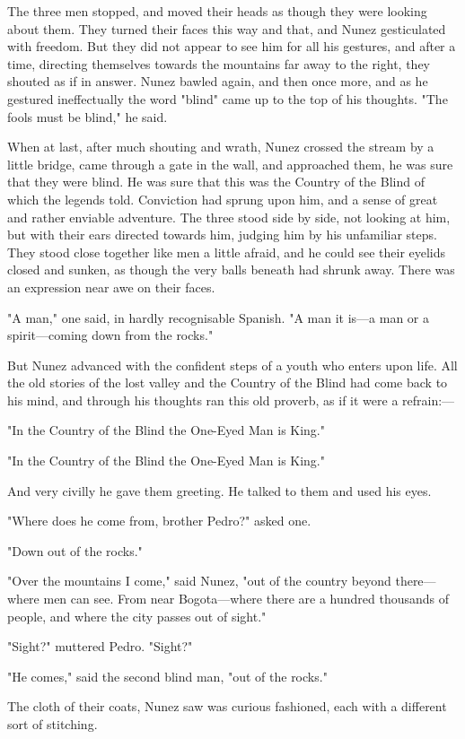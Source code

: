 \documentclass[courier]{sffms}
\begin{document}
The three men stopped, and moved their heads as though they were
looking about them. They turned their faces this way and that, and
Nunez gesticulated with freedom. But they did not appear to see him
for all his gestures, and after a time, directing themselves towards
the mountains far away to the right, they shouted as if in
answer. Nunez bawled again, and then once more, and as he gestured
ineffectually the word "blind" came up to the top of his
thoughts. "The fools must be blind," he said.

When at last, after much shouting and wrath, Nunez crossed the stream
by a little bridge, came through a gate in the wall, and approached
them, he was sure that they were blind. He was sure that this was the
Country of the Blind of which the legends told. Conviction had sprung
upon him, and a sense of great and rather enviable adventure. The
three stood side by side, not looking at him, but with their ears
directed towards him, judging him by his unfamiliar steps. They stood
close together like men a little afraid, and he could see their
eyelids closed and sunken, as though the very balls beneath had shrunk
away. There was an expression near awe on their faces.

"A man," one said, in hardly recognisable Spanish. "A man it is---a man
or a spirit---coming down from the rocks."

But Nunez advanced with the confident steps of a youth who enters upon
life. All the old stories of the lost valley and the Country of the
Blind had come back to his mind, and through his thoughts ran this old
proverb, as if it were a refrain:---

"In the Country of the Blind the One-Eyed Man is King."

"In the Country of the Blind the One-Eyed Man is King."

And very civilly he gave them greeting. He talked to them and used his
eyes.

"Where does he come from, brother Pedro?" asked one.

"Down out of the rocks."

"Over the mountains I come," said Nunez, "out of the country beyond
there---where men can see. From near Bogota---where there are a hundred
thousands of people, and where the city passes out of sight."

"Sight?" muttered Pedro. "Sight?"

"He comes," said the second blind man, "out of the rocks."

The cloth of their coats, Nunez saw was curious fashioned, each with a
different sort of stitching.
\end{document}
